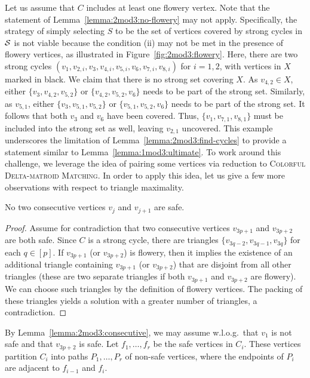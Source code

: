 Let us assume that $C$ includes at least one flowery vertex.
Note that the statement of Lemma~\ref{lemma:2mod3:no-flowery} may not apply.
Specifically, the strategy of simply selecting $S$ to be the set of vertices covered by strong cycles in $\mathcal S$ is not viable because the condition (ii) may not be met in the presence of flowery vertices, as illustrated in Figure~\ref{fig:2mod3:flowery}.
Here, there are two strong cycles $(v_1, v_{2,i}, v_3, v_{4,i}, v_{5,i}, v_6, v_{7,i}, v_{8,i})$ for $i = 1, 2$, with vertices in $X$ marked in black.
We claim that there is no strong set covering $X$.
As $v_{4,2} \in X$, either $\{ v_3, v_{4,2}, v_{5,2} \}$ or $\{ v_{4,2}, v_{5,2}, v_6 \}$ needs to be part of the strong set.
Similarly, as $v_{5,1}$, either $\{ v_3, v_{5,1}, v_{5,2} \}$ or $\{ v_{5,1}, v_{5,2}, v_6 \}$ needs to be part of the strong set.
It follows that both $v_3$ and $v_6$ have been covered.
Thus, $\{ v_1, v_{7, 1}, v_{8,1} \}$ must be included into the strong set as well, leaving $v_{2,1}$ uncovered.
This example underscores the limitation of Lemma~\ref{lemma:2mod3:find-cycles} to provide a statement similar to Lemma~\ref{lemma:1mod3:ultimate}.
To work around this challenge, we leverage the idea of pairing some vertices via reduction to \textsc{Colorful Delta-matroid Matching}.
In order to apply this idea, let us give a few more observations with respect to triangle maximality.

\begin{lemma} \label{lemma:2mod3:consecutive}
  No two consecutive vertices $v_j$ and $v_{j+1}$ are safe.
\end{lemma}
\begin{proof}
  Assume for contradiction that two consecutive vertices $v_{3p+1}$ and $v_{3p+2}$ are both safe.
  Since $C$ is a strong cycle, there are triangles $\{ v_{3q-2}, v_{3q-1}, v_{3q}\}$ for each $q \in [p]$.
  If $v_{3p+1}$ (or $v_{3p+2}$) is flowery, then it implies the existence of an additional triangle containing $v_{3p+1}$ (or $v_{3p+2}$) that are disjoint from all other triangles (these are two separate triangles if both $v_{3p+1}$ and $v_{3p+2}$ are flowery).
  We can choose such triangles by the definition of flowery vertices.
  The packing of these triangles yields a solution with a greater number of triangles, a contradiction.
\end{proof}

By Lemma~\ref{lemma:2mod3:consecutive}, we may assume w.l.o.g.\ that $v_{1}$ is not safe and that $v_{3p+2}$ is safe.
Let $f_1, \dots, f_r$ be the safe vertices in $C_i$.
These vertices partition $C_i$ into paths $P_1, \dots, P_r$ of non-safe vertices, where the endpoints of $P_i$ are adjacent to $f_{i-1}$ and $f_i$.


